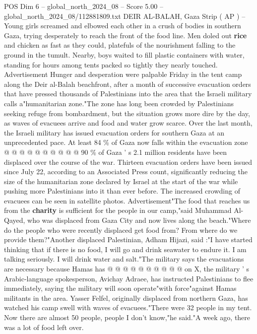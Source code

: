 \begin{textsample}{POS Dim 6 – global\_north\_2024\_08 – Score 5.00 – global\_north\_2024\_08/112881809.txt}  \label{ex:f6_pos_375}
DEIR AL-BALAH, Gaza Strip ( AP ) -- Young girls screamed and elbowed each other in a crush of bodies in southern Gaza, trying desperately to reach the front of the food line.
Men doled out \textbf{rice} and chicken as fast as they could, platefuls of the nourishment falling to the ground in the tumult.
Nearby, boys waited to fill plastic containers with water, standing for hours among tents packed so tightly they nearly touched.
Advertisement Hunger and desperation were palpable Friday in the tent camp along the Deir al-Balah beachfront, after a month of successive evacuation orders that have pressed thousands of Palestinians into the area that the Israeli military calls a"humanitarian zone."The zone has long been crowded by Palestinians seeking refuge from bombardment, but the situation grows more dire by the day, as waves of evacuees arrive and food and water grow scarce.
Over the last month, the Israeli military has issued evacuation orders for southern Gaza at an unprecedented pace.
At least 84 \% of Gaza now falls within the evacuation zone @ @ @ @ @ @ @ @ @ @ 90 \% of Gaza ' s 2.1 million residents have been displaced over the course of the war.
Thirteen evacuation orders have been issued since July 22, according to an Associated Press count, significantly reducing the size of the humanitarian zone declared by Israel at the start of the war while pushing more Palestinians into it than ever before.
The increased crowding of evacuees can be seen in satellite photos.
Advertisement"The food that reaches us from the \textbf{charity} is sufficient for the people in our camp,"said Muhammad Al-Qayed, who was displaced from Gaza City and now lives along the beach."Where do the people who were recently displaced get food from?
From where do we provide them?"Another displaced Palestinian, Adham Hijazi, said :"I have started thinking that if there is no food, I will go and drink seawater to endure it.
I am talking seriously.
I will drink water and salt."The military says the evacuations are necessary because Hamas has @ @ @ @ @ @ @ @ @ @ on X, the military ' s Arabic-language spokesperson, Avichay Adraee, has instructed Palestinians to flee immediately, saying the military will soon operate"with force"against Hamas militants in the area.
Yasser Felfel, originally displaced from northern Gaza, has watched his camp swell with waves of evacuees."There were 32 people in my tent.
Now there are almost 50 people, people I don't know,"he said."A week ago, there was a lot of food left over.

\end{textsample}
